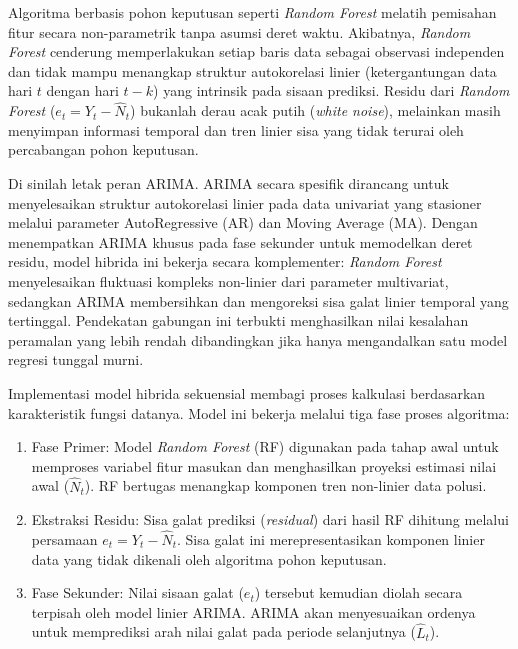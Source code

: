 Algoritma berbasis pohon keputusan seperti \textit{Random Forest} melatih pemisahan fitur secara non-parametrik tanpa asumsi deret waktu. Akibatnya, \textit{Random Forest} cenderung memperlakukan setiap baris data sebagai observasi independen dan tidak mampu menangkap struktur autokorelasi linier (ketergantungan data hari $t$ dengan hari $t-k$) yang intrinsik pada sisaan prediksi. Residu dari \textit{Random Forest} ($e_t = Y_t - \hat{N}_t$) bukanlah derau acak putih (\textit{white noise}), melainkan masih menyimpan informasi temporal dan tren linier sisa yang tidak terurai oleh percabangan pohon keputusan. 

\newpage

Di sinilah letak peran ARIMA. ARIMA secara spesifik dirancang untuk menyelesaikan struktur autokorelasi linier pada data univariat yang stasioner melalui parameter AutoRegressive (AR) dan Moving Average (MA). Dengan menempatkan ARIMA khusus pada fase sekunder untuk memodelkan deret residu, model hibrida ini bekerja secara komplementer: \textit{Random Forest} menyelesaikan fluktuasi kompleks non-linier dari parameter multivariat, sedangkan ARIMA membersihkan dan mengoreksi sisa galat linier temporal yang tertinggal. Pendekatan gabungan ini terbukti menghasilkan nilai kesalahan peramalan yang lebih rendah dibandingkan jika hanya mengandalkan satu model regresi tunggal murni.

Implementasi model hibrida sekuensial membagi proses kalkulasi berdasarkan karakteristik fungsi datanya. Model ini bekerja melalui tiga fase proses algoritma:
\begin{enumerate}
    \item {Fase Primer:} Model \textit{Random Forest} (RF) digunakan pada tahap awal untuk memproses variabel fitur masukan dan menghasilkan proyeksi estimasi nilai awal ($\hat{N}_t$). RF bertugas menangkap komponen tren non-linier data polusi.
    \item {Ekstraksi Residu:} Sisa galat prediksi (\textit{residual}) dari hasil RF dihitung melalui persamaan $e_t = Y_t - \hat{N}_t$. Sisa galat ini merepresentasikan komponen linier data yang tidak dikenali oleh algoritma pohon keputusan.
    \item {Fase Sekunder:} Nilai sisaan galat ($e_t$) tersebut kemudian diolah secara terpisah oleh model linier ARIMA. ARIMA akan menyesuaikan ordenya untuk memprediksi arah nilai galat pada periode selanjutnya ($\hat{L}_t$).
\end{enumerate}

\bigskip

